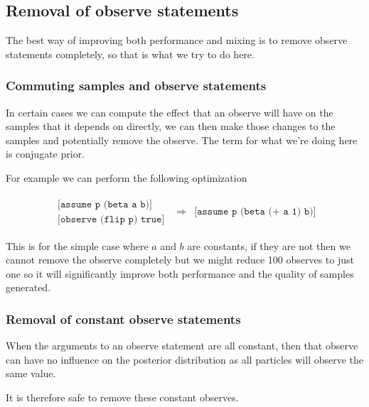 \documentclass[a4paper]{article}
\newcommand{\optimization}[2]{
	\[
		\begin{array}{rcl}
			#1 & \Rightarrow & #2
		\end{array}
	\]
}
\begin{document}
\subsection{Removal of observe statements}

The best way of improving both performance and mixing is to remove observe statements completely, so that is what we try to do here.




\subsubsection{Commuting samples and observe statements}

In certain cases we can compute the effect that an observe will have on the samples that it depends on directly, we can then make those changes to the samples and potentially remove the observe. The term for what we're doing here is conjugate prior.

For example we can perform the following optimization
\optimization{
	\begin{array}{l}
		\texttt{[assume p (beta a b)]} \\
		\texttt{[observe (flip p) true]}
	\end{array}
}{
	\texttt{[assume p (beta (+ a 1) b)]}
}
This is for the simple case where \(a\) and \(b\) are constants, if they are not then we cannot remove the observe completely but we might reduce 100 observes to just one so it will significantly improve both performance and the quality of samples generated.




\subsubsection{Removal of constant observe statements}

When the arguments to an observe statement are all constant, then that observe can have no influence on the posterior distribution as all particles will observe the same value.

It is therefore safe to remove these constant observes.
\end{document}
